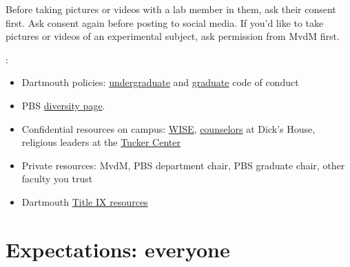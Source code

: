 \documentclass{tufte-book}
\begin{document}
Before taking pictures or videos with a lab member in them, ask their
consent first. Ask consent again before posting to social media. If
you'd like to take pictures or videos of an experimental subject, ask
permission from MvdM first.

:

\begin{itemize}
\item{Dartmouth policies: \href{https://student-affairs.dartmouth.edu/policy/standards-conduct}{undergraduate} and \href{https://graduate.dartmouth.edu/policy/code-conduct-nonacademic-regulations}{graduate} code of conduct}
\item{PBS \href{https://pbs.dartmouth.edu/diversity}{diversity page}.}
\item{Confidential resources on campus:
  \href{http://www.wiseuv.org/dartmouth---home.html}{WISE},
  \href{https://students.dartmouth.edu/health-service/counseling/about/clinical-services/counseling}{counselors}
  at Dick's House, religious leaders at the
  \href{https://students.dartmouth.edu/tucker/about/pastoral-counseling}{Tucker
    Center}}
\item{Private resources: MvdM, PBS department chair, PBS graduate
  chair, other faculty you trust}
\item{Dartmouth \href{https://journeys.dartmouth.edu/knowyourrights/resources/}{Title IX resources}}
\end{itemize}

\section{Expectations: everyone}

\end{document}
